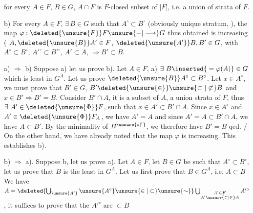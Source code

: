 for every $A\in F$, $B\in G$, $A\cap F$ is  $F$-closed subset of $|F|$, i.e. a union of strata of $F$.

b) For every $A\in F$, $\exists\,B\in G$ such that $A^\circ\subset B^\circ$ (obviously unique stratum, ), the map $\varphi:\deleted{\unsure{F}}F\unsure{-|\longrightarrow}G$ thus obtained is increasing (
   $A,\deleted{\unsure{B}}A'\in F$, $\deleted{\unsure{A'}}B,B'\in G$,  with $A^\circ\subset B^\circ$, $A'^\circ\subset B'^\circ$, $A'\subset A$, $\Longrightarrow B'\subset B$.

a) $\Longrightarrow$ b) Suppose a) let us prove b). Let $A\in F$,  a) $\exists\ B\inserted{{}=\varphi(A)}\in G$  which is least in $G^A$. Let us prove $\deleted{\unsure{B}}A^\circ\subset B^\circ$. Let
$x\in A^\circ$, we must prove that $B'\in G$, $B'\deleted{\unsure{\in}}\unsure{\subset|\not\subset} B$ and $x\in B'\Longrightarrow B'=B$.  Consider $B'\cap A$, it is a subset of $A$, a union  strata of $F$,
thus $\exists\ A'\in\deleted{\unsure{\Phi}}F$, such that $x\in A'\subset B'\cap A$. Since $x\in A^\circ$ and $A'\in\deleted{\unsure{\Phi}}F_A$, we have $A'=A$ and since $A'=A\subset B'\cap A$, we have $A\subset B'$. By the minimality of
$B^{\unsure{s|'}}$, we therefore have $B'=B$ qed. / On the other hand, we have already noted that the map $\varphi$ is increasing. This establishes b).

b) $\Longrightarrow$ a). Suppose b, let us prove a). Let $A\in F$, let $B\in G$ be such that $A^\circ\subset B^\circ$, let us prove that $B$ is the least  in $G^A$.
Let us first prove that $B\in G^A$, i.e. $A\subset B$ 
 We have $A=\deleted{\bigcup_{\unsure{A'}}\unsure{A^\circ}\unsure{\in|\subset}\unsure{\sim}}\bigcup_{\substack{A'\in F\\ A'\unsure{\subset|\in} A}} A'^\circ$,  it suffices to prove that the $A'^\circ$ are $\subset B$
